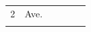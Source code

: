 {{\begin{center}
\begin{tabular}[t]{|l|l|l|l|l|l|}
    
        2 &
    
    
        Ave.%
     \tabularnewline\cline{1-1}\cline{2-2}\cline{3-3}\cline{4-4}\cline{5-5}\cline{6-6}
    
    
         &
    
    
         &
    
    
         &
    
    
         &
    
    
         &
    
    
     \tabularnewline\cline{1-1}\cline{2-2}\cline{3-3}\cline{4-4}\cline{5-5}\cline{6-6}
    

\end{tabular}
\end{center}}}
